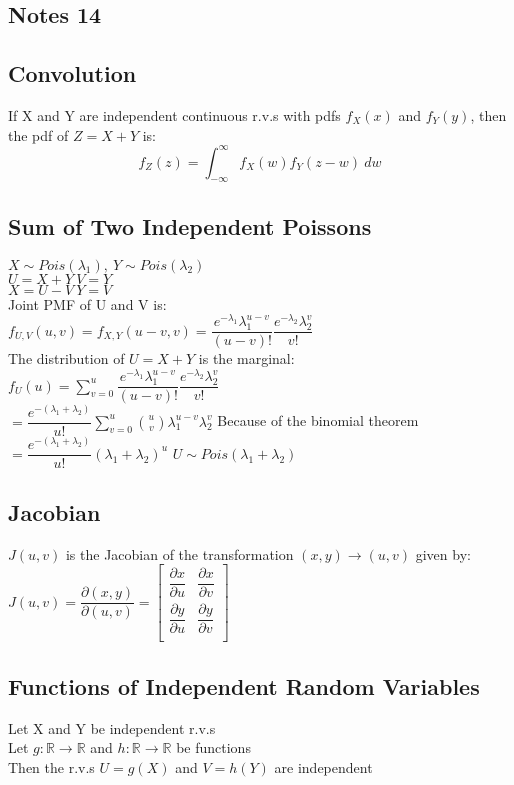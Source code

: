 \documentclass{article}
\begin{document}
\begin{flushleft}
\section*{Notes 14}
\subsection*{Convolution}
If X and Y are independent continuous r.v.s with pdfs $f_X(x)$ and $f_Y(y)$, then the pdf of $Z=X+Y$ is:
\[f_Z(z)=\int_{-\infty}^{\infty}f_X(w)f_Y(z-w)\ dw
\]
\subsection*{Sum of Two Independent Poissons}
$X\sim Pois(\lambda_1), \ Y\sim Pois(\lambda_2)$\\
$U=X+Y \ V=Y$\\
$X=U-V \ Y=V$\\
Joint PMF of U and V is:\\
$f_{U,V}(u,v)=f_{X,Y}(u-v,v)=\dfrac{e^{-\lambda_1}\lambda_1^{u-v}}{(u-v)!}\dfrac{e^{-\lambda_2}\lambda_2^v}{v!}$\\
The distribution of $U=X+Y$ is the marginal:\\
$f_U(u)=\sum_{v=0}^{u}\dfrac{e^{-\lambda_1}\lambda_1^{u-v}}{(u-v)!}\dfrac{e^{-\lambda_2}\lambda_2^v}{v!}$\\
$=\dfrac{e^{-(\lambda_1+\lambda_2)}}{u!}\sum_{v=0}^{u} {u \choose v}\lambda_1^{u-v}\lambda_2^v$\medbreak
Because of the binomial theorem\medbreak
$=\dfrac{e^{-(\lambda_1+\lambda_2)}}{u!}(\lambda_1+\lambda_2)^u$\medbreak
$U\sim Pois(\lambda_1+\lambda_2)$
\subsection*{Jacobian}
$J(u,v)$ is the Jacobian of the transformation $(x,y)\to (u,v)$ given by:\medbreak
$J(u,v)=\dfrac{\partial(x,y)}{\partial(u,v)}=
\begin{bmatrix}
\dfrac{\partial x}{\partial u}& \dfrac{\partial x}{\partial v}\\
\dfrac{\partial y}{\partial u}& \dfrac{\partial y}{\partial v}\\
\end{bmatrix}$
\subsection*{Functions of Independent Random Variables}
Let X and Y be independent r.v.s\\
Let $g:\mathbb{R}\to \mathbb{R}$ and $h:\mathbb{R}\to \mathbb{R}$ be functions\\
Then the r.v.s $U=g(X)$ and $V=h(Y)$ are independent

\end{flushleft}
\end{document}
